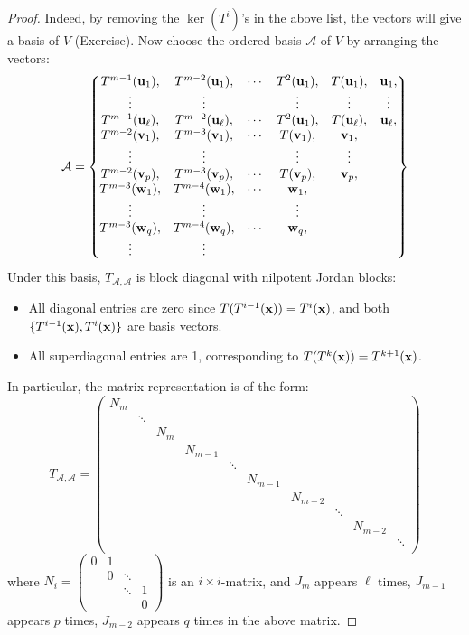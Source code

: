 \begin{proof}
Indeed, by removing the $\ker(T^i)$'s in the above list, the vectors will give a basis of $V$ (Exercise). Now choose the ordered basis \( \mathcal{A} \) of $V$ by arranging the vectors:
\[
\mathcal{A} = \left\{ 
\begin{matrix}
T^{m-1}({\bf u}_1), & T^{m-2}({\bf u}_1), & \cdots & T^2({\bf u}_1), & T({\bf u}_1), & {\bf u}_1, \\
\vdots & \vdots &  & \vdots & \vdots & \vdots\\
T^{m-1}({\bf u}_{\ell}), & T^{m-2}({\bf u}_{\ell}), & \cdots & T^2({\bf u}_1), & T({\bf u}_{\ell}), & {\bf u}_{\ell}, \\
T^{m-2}({\bf v}_1), & T^{m-3}({\bf v}_1), & \cdots & T({\bf v}_1), & {\bf v}_1, &  \\
\vdots & \vdots &  & \vdots & \vdots \\
T^{m-2}({\bf v}_p), & T^{m-3}({\bf v}_p), & \cdots & T({\bf v}_p), & {\bf v}_p, &  \\
T^{m-3}({\bf w}_1), & T^{m-4}({\bf w}_1), & \cdots & {\bf w}_1, &   \\
\vdots & \vdots &  & \vdots \\
T^{m-3}({\bf w}_q), & T^{m-4}({\bf w}_q), & \cdots & {\bf w}_q, &  \\
\vdots & \vdots
\end{matrix} \right\}
\]
Under this basis, \( T_{\mathcal{A},\mathcal{A}} \) is block diagonal with nilpotent Jordan blocks:
\begin{itemize}
  \item All diagonal entries are zero since \( T(T^{i-1}({\bf x})) = T^i({\bf x})\), and both $\{T^{i-1}({\bf x}), T^i({\bf x})\}$ are basis vectors.
  \item All superdiagonal entries are 1, corresponding to \( T(T^{k}({\bf x})) = T^{k+1}({\bf x}) \).
\end{itemize}
In particular, the matrix representation is of the form:
$$T_{\mathcal{A},\mathcal{A}} = \begin{pmatrix}
    N_m & & & & & &\\
    & \ddots & & & & & \\
    & & N_m & & & & \\
    & & & N_{m-1} & & & \\
    & & & & \ddots & & \\
    & & & & & N_{m-1} &  \\
    & & & & & & N_{m-2} \\
    & & & & & & & \ddots \\
    & & & & & & & & N_{m-2} \\
    & & & & & & & & & \ddots \\
\end{pmatrix}$$
where $N_i = \begin{pmatrix}
0 & 1       &        &        \\
        & 0 & \ddots &        \\
        &         & \ddots & 1      \\
        &         &        & 0
\end{pmatrix}$ is an $i \times i$-matrix, and $J_m$ appears $\ell$ times, $J_{m-1}$ appears $p$ times, $J_{m-2}$ appears $q$ times in the above matrix.
\end{proof}


